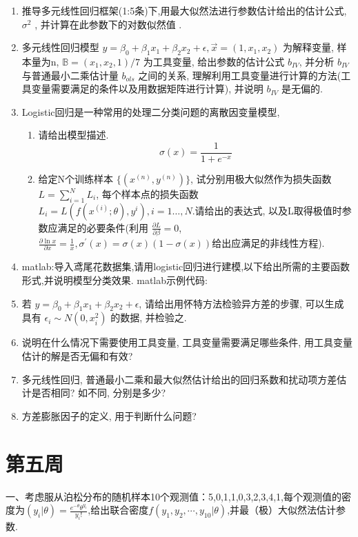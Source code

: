 \begin{enumerate}


\item 推导多元线性回归框架(1:5条)下,用最大似然法进行参数估计给出的估计公式, $\sigma^{2}$ , 并计算在此参数下的对数似然值 .

\item 多元线性回归模型 $y=\beta_{0}+\beta_{1}x_{1}+\beta_{2}x_{2}+\epsilon, \vec{x}=(1,x_{1},x_{2})$ 为解释变量, 样本量为n, $\mathbb{B}=(x_{1},x_{2},1)/7$ 为工具变量, 给出参数的估计公式 $b_{IV}$, 并分析 $b_{IV}$ 与普通最小二乘估计量 $b_{ols}$ 之间的关系, 理解利用工具变量进行计算的方法(工具变量需要满足的条件以及用数据矩阵进行计算), 并说明 $b_{IV}$ 是无偏的.

\item Logistic回归是一种常用的处理二分类问题的离散因变量模型,
\begin{enumerate}
    \item[(a)] 请给出模型描述.
    \[ \sigma(x)=\frac{1}{1+e^{-x}} \]
    \item[(b)] 给定N个训练样本 $\{(x^{(n)},y^{(n)})\}$, 试分别用极大似然作为损失函数 $L=\sum_{i=1}^{N}L_{i}$, 每个样本点的损失函数 $L_{i}=L(f(x^{(i)};\theta),y^{i}), i=1\dots,N$.请给出的表达式, 以及L取得极值时参数应满足的必要条件(利用 $\frac{\partial L}{\partial\beta}=0$, $\frac{\partial \ln x}{\partial x}=\frac{1}{x}, \sigma^{\prime}(x)=\sigma(x)(1-\sigma(x))$给出应满足的非线性方程).
\end{enumerate}

\item matlab:导入鸢尾花数据集,请用logistic回归进行建模,以下给出所需的主要函数形式,并说明模型分类效果.
matlab示例代码: 


\item 若 $y=\beta_{0}+\beta_{1}x_{1}+\beta_{2}x_{2}+\epsilon$, 请给出用怀特方法检验异方差的步骤, 可以生成具有 $\epsilon_{i}\sim N(0,x_{i}^{2})$ 的数据, 并检验之.

\item 说明在什么情况下需要使用工具变量, 工具变量需要满足哪些条件, 用工具变量估计的解是否无偏和有效?

\item 多元线性回归, 普通最小二乘和最大似然估计给出的回归系数和扰动项方差估计是否相同? 如不同, 分别是多少?

\item 方差膨胀因子的定义, 用于判断什么问题?

\end{enumerate}

\section{第五周}
一、考虑服从泊松分布的随机样本10个观测值：5,0,1,1,0,3,2,3,4,1,每个观测值的密度为$(y_i|\theta)=\frac{e^{-\theta}\theta^{y_i}}{y_i!}$,给出联合密度$f(y_1,y_2,\cdots,y_{10}|\theta)$,并最（极）大似然法估计参数.

